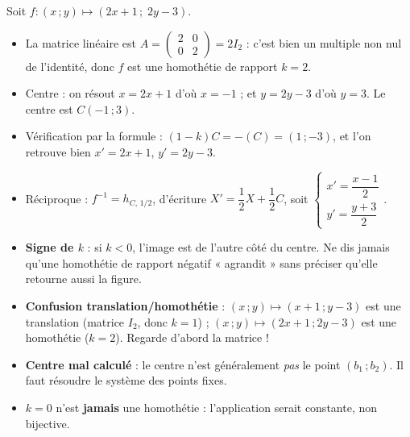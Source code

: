 \documentclass[11pt]{article}
\begin{document}
\begin{exemplebox}
Soit $f : (x\,;y) \mapsto (2x+1\,;\;2y-3)$.
\begin{itemize}
\item La matrice linéaire est $A = \begin{pmatrix} 2 & 0 \\ 0 & 2 \end{pmatrix} = 2I_2$ : c'est bien un multiple non nul de l'identité, donc $f$ est une homothétie de rapport $k = 2$.
\item Centre : on résout $x = 2x + 1$ d'où $x = -1$ ; et $y = 2y - 3$ d'où $y = 3$. Le centre est $C(-1\,;3)$.
\item Vérification par la formule : $(1-k)C = -(C) = (1\,;-3)$, et l'on retrouve bien $x' = 2x + 1$, $y' = 2y - 3$.
\item Réciproque : $f^{-1} = h_{C,\,1/2}$, d'écriture $X' = \dfrac{1}{2}X + \dfrac{1}{2}C$, soit $\begin{cases} x' = \dfrac{x - 1}{2} \\[2pt] y' = \dfrac{y + 3}{2} \end{cases}$.
\end{itemize}
\end{exemplebox}

\begin{attention}
\begin{itemize}
\item \textbf{Signe de $k$} : si $k < 0$, l'image est de l'autre côté du centre. Ne dis jamais qu'une homothétie de rapport négatif « agrandit » sans préciser qu'elle retourne aussi la figure.
\item \textbf{Confusion translation/homothétie} : $(x\,;y) \mapsto (x+1\,;y-3)$ est une translation (matrice $I_2$, donc $k = 1$) ; $(x\,;y) \mapsto (2x+1\,;2y-3)$ est une homothétie ($k = 2$). Regarde d'abord la matrice !
\item \textbf{Centre mal calculé} : le centre n'est généralement \emph{pas} le point $(b_1\,;b_2)$. Il faut résoudre le système des points fixes.
\item $k = 0$ n'est \textbf{jamais} une homothétie : l'application serait constante, non bijective.
\end{itemize}
\end{attention}
\end{document}

